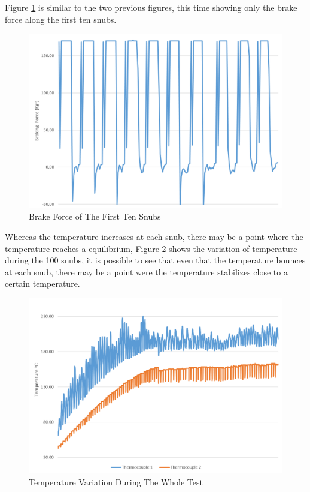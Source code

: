 		Figure \ref{fig:test-first-ten-snubs-force} is similar to the two previous figures, this time showing only the brake force along the first ten snubs.
		\begin{figure}[htbp]
				\centering
				\includegraphics[width=.8\textwidth]{figuras/fig-test-first-ten-snubs-force}
				\caption{Brake Force of The First Ten Snubs}
				\label{fig:test-first-ten-snubs-force}
		\end{figure}
		\par

		Whereas the temperature increases at each snub, there may be a point where the temperature reaches a equilibrium, Figure \ref{fig:test-temperature} shows the variation of temperature during the 100 snubs, it is possible to see that even that the temperature bounces at each snub, there may be a point were the temperature stabilizes close to a certain temperature.

		\begin{figure}[htbp]
				\centering
				\includegraphics[width=.8\textwidth]{figuras/fig-test-temperature}
				\caption{Temperature Variation During The Whole Test}
				\label{fig:test-temperature}
		\end{figure}
		\par

